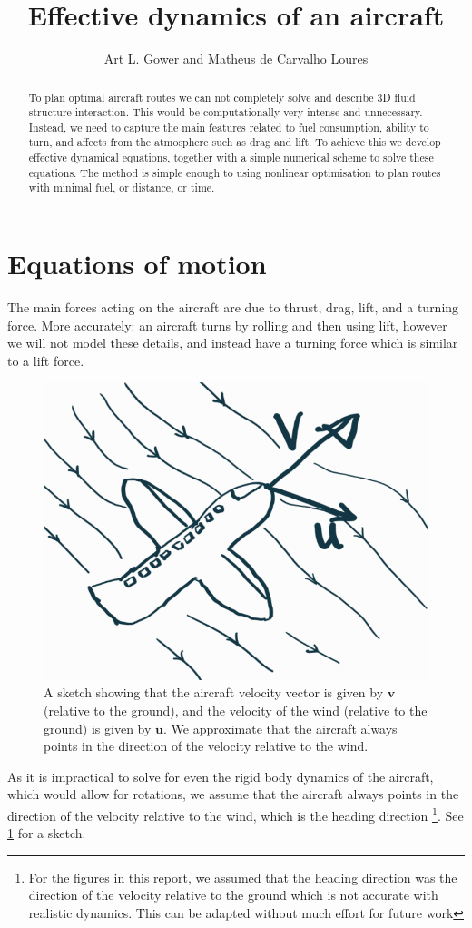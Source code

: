 \documentclass{article}
\title{Effective dynamics of an aircraft}
\author{Art L. Gower and Matheus de Carvalho Loures}
\renewcommand{\vec}[1]{\boldsymbol{#1}}
\begin{document}
\maketitle

\begin{abstract}
    To plan optimal aircraft routes we can not completely solve and describe 3D fluid structure interaction. This would be computationally very intense and unnecessary. Instead, we need to capture the main features related to fuel consumption, ability to turn, and affects from the atmosphere such as drag and lift. To achieve this we develop effective dynamical equations, together with a simple numerical scheme to solve these equations. The method is simple enough to using nonlinear optimisation to plan routes with minimal fuel, or distance, or time.  
\end{abstract}

\section{Equations of motion}
The main forces acting on the aircraft are due to thrust, drag, lift, and a turning force. More accurately: an aircraft turns by rolling and then using lift, however we will not model these details, and instead have a turning force which is similar to a lift force.

\begin{figure}[ht]
    \centering
    \includegraphics[width = 0.4\linewidth]{"plane-sketch.png"}
    \caption{A sketch showing that the aircraft velocity vector is given by $\vec v$ (relative to the ground), and the velocity of the wind (relative to the ground) is given by $\vec u$. We approximate that the aircraft always points in the direction of the velocity relative to the wind.}
    \label{fig:plane-sketch}
\end{figure}

As it is impractical to solve for even the rigid body dynamics of the aircraft, which would allow for rotations, we assume that the aircraft always points in the direction of the velocity relative to the wind, which is the heading direction \footnote{For the figures in this report, we assumed that the heading direction was the direction of the velocity relative to the ground which is not accurate with realistic dynamics. This can be adapted without much effort for future work}. See \cref{fig:plane-sketch} for a sketch. 
\end{document}
